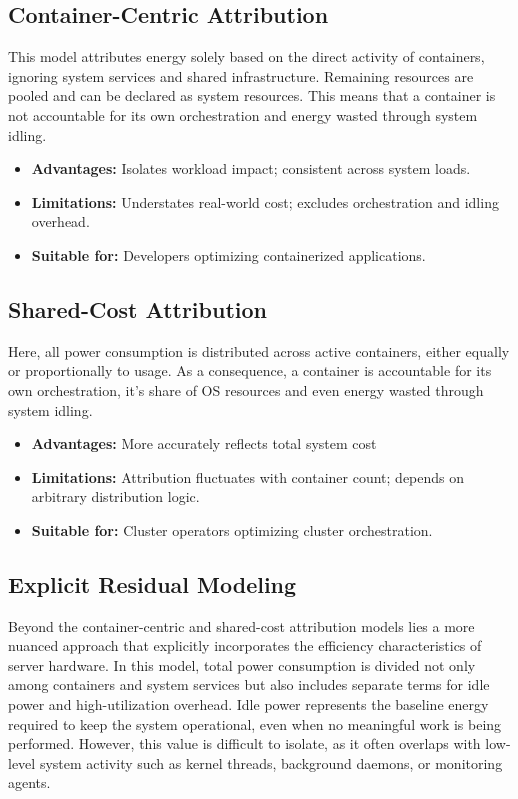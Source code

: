 \subsection{Container-Centric Attribution}
\label{sec:container-centric}

This model attributes energy solely based on the direct activity of containers, ignoring system services and shared infrastructure. Remaining resources are pooled and can be declared as system resources. This means that a container is not accountable for its own orchestration and energy wasted through system idling.

\begin{itemize}
    \item \textbf{Advantages:} Isolates workload impact; consistent across system loads.
    \item \textbf{Limitations:} Understates real-world cost; excludes orchestration and idling overhead.
    \item \textbf{Suitable for:} Developers optimizing containerized applications.
\end{itemize}

\subsection{Shared-Cost Attribution}
\label{sec:shared-cost}

Here, all power consumption is distributed across active containers, either equally or proportionally to usage. As a consequence, a container is accountable for its own orchestration, it's share of OS resources and even energy wasted through system idling.

\begin{itemize}
    \item \textbf{Advantages:} More accurately reflects total system cost
    \item \textbf{Limitations:} Attribution fluctuates with container count; depends on arbitrary distribution logic.
    \item \textbf{Suitable for:} Cluster operators optimizing cluster orchestration.
\end{itemize}

\subsection{Explicit Residual Modeling}
\label{sec:residual-model}

Beyond the container-centric and shared-cost attribution models lies a more nuanced approach that explicitly incorporates the efficiency characteristics of server hardware. In this model, total power consumption is divided not only among containers and system services but also includes separate terms for idle power and high-utilization overhead. Idle power represents the baseline energy required to keep the system operational, even when no meaningful work is being performed. However, this value is difficult to isolate, as it often overlaps with low-level system activity such as kernel threads, background daemons, or monitoring agents.

